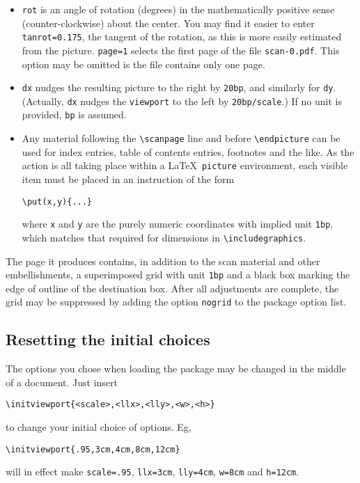 \documentclass[11pt]{article}
\begin{document}
\begin{itemize}
\item
{\tt rot} is an angle of rotation (degrees) in the mathematically positive sense (counter-clockwise) about the center. You may find it easier to enter {\tt tanrot=0.175}, the tangent of the rotation, as this is more easily estimated from the picture.
{\tt page=1} selects the first page of the file {\tt scan-0.pdf}. This option may be omitted is the file contains only one page.
\item {\tt dx} nudges the resulting picture to the right by {\tt 20bp}, and similarly for {\tt dy}. (Actually, {\tt dx} nudges the {\tt viewport} to the left by {\tt 20bp/scale}.) If no unit is provided, {\tt bp} is assumed.
\item Any material following the \verb|\scanpage| line and before \verb|\endpicture| can be used for index entries, table of contents entries, footnotes and the like. As the action is all taking place within a \LaTeX\ {\tt picture} environment, each visible item must be placed in an instruction of the form
\begin{verbatim}
\put(x,y){...}
\end{verbatim}
where {\tt x} and {\tt y} are the purely numeric coordinates with implied unit {\tt 1bp}, which matches that required for dimensions in \verb|\includegraphics|.
\end{itemize}

The page it produces contains, in addition to the scan material and other embellishments, a superimposed grid with unit {\tt 1bp} and a black box marking the edge of outline of the destination box. After all adjustments are complete,  the grid may be suppressed by adding the option {\tt nogrid} to the package option list.
\subsection{Resetting the initial choices}
The options you chose when loading the package may be changed in the middle of a document. Just insert
\begin{verbatim}
\initviewport{<scale>,<llx>,<lly>,<w>,<h>}
\end{verbatim}
to change your initial choice of options. Eg,
\begin{verbatim}
\initviewport{.95,3cm,4cm,8cm,12cm}
\end{verbatim}
will in effect make {\tt scale=.95}, {\tt llx=3cm}, {\tt lly=4cm}, {\tt w=8cm} and {\tt h=12cm}. 
\end{document}
